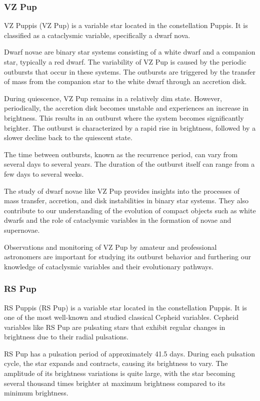 \subsubsection*{ VZ Pup }
VZ Puppis (VZ Pup) is a variable star located in the constellation Puppis. It is classified as a cataclysmic variable, specifically a dwarf nova.

Dwarf novae are binary star systems consisting of a white dwarf and a companion star, typically a red dwarf. The variability of VZ Pup is caused by the periodic outbursts that occur in these systems. The outbursts are triggered by the transfer of mass from the companion star to the white dwarf through an accretion disk.

During quiescence, VZ Pup remains in a relatively dim state. However, periodically, the accretion disk becomes unstable and experiences an increase in brightness. This results in an outburst where the system becomes significantly brighter. The outburst is characterized by a rapid rise in brightness, followed by a slower decline back to the quiescent state.

The time between outbursts, known as the recurrence period, can vary from several days to several years. The duration of the outburst itself can range from a few days to several weeks.

The study of dwarf novae like VZ Pup provides insights into the processes of mass transfer, accretion, and disk instabilities in binary star systems. They also contribute to our understanding of the evolution of compact objects such as white dwarfs and the role of cataclysmic variables in the formation of novae and supernovae.

Observations and monitoring of VZ Pup by amateur and professional astronomers are important for studying its outburst behavior and furthering our knowledge of cataclysmic variables and their evolutionary pathways.

\subsubsection*{ RS Pup }
RS Puppis (RS Pup) is a variable star located in the constellation Puppis. It is one of the most well-known and studied classical Cepheid variables. Cepheid variables like RS Pup are pulsating stars that exhibit regular changes in brightness due to their radial pulsations.

RS Pup has a pulsation period of approximately 41.5 days. During each pulsation cycle, the star expands and contracts, causing its brightness to vary. The amplitude of its brightness variations is quite large, with the star becoming several thousand times brighter at maximum brightness compared to its minimum brightness.

